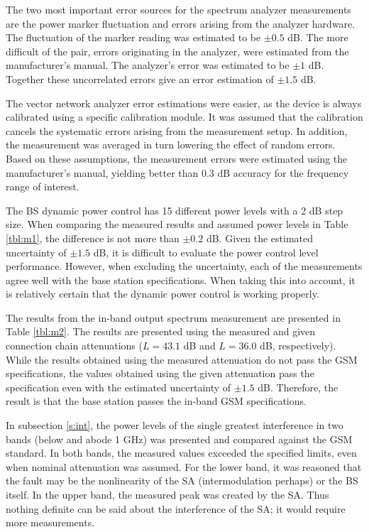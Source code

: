 \documentclass[a4paper, 12pt]{article}
\begin{document}
The two most important error sources for the spectrum analyzer measurements are 
the power marker fluctuation and errors arising from the analyzer hardware. 
The fluctuation of the marker reading was estimated to be $\pm 0.5$ dB. The more 
difficult of the pair, errors originating in the analyzer, were estimated from 
the manufacturer's manual. The analyzer’s error was estimated to be $\pm 1$ dB. 
Together these uncorrelated errors give an error estimation of $\pm 1.5$ dB.

The vector network analyzer error estimations were easier, as the device is 
always calibrated using a specific calibration module. It was assumed that the 
calibration cancels the systematic errors arising from the measurement setup. In 
addition, the measurement was averaged in turn lowering the effect of random errors. 
Based on these assumptions, the measurement errors were estimated using the 
manufacturer’s manual, yielding better than 0.3 dB accuracy for the frequency 
range of interest.

The BS dynamic power control has 15 different power levels with a 2 dB step size. 
When comparing the measured results and assumed power levels in Table \ref{tbl:m1}, 
the difference is not more than $\pm 0.2$ dB. Given the estimated uncertainty of 
$\pm 1.5$ dB, it is difficult to evaluate the power control level performance. 
However, when excluding the uncertainty, each of the measurements agree well with 
the base station specifications. When taking this into account, it is relatively 
certain that the dynamic power control is working properly.

The results from the in-band output spectrum measurement are presented in Table 
\ref{tbl:m2}. The results are presented using the measured and given connection 
chain attenuations ($L = 43.1$ dB and $L = 36.0$ dB, respectively). While the 
results obtained using the measured attenuation do not pass the GSM specifications, 
the values obtained using the given attenuation pass the specification even with 
the estimated uncertainty of $\pm 1.5$ dB. Therefore, the result is that the 
base station passes the in-band GSM specifications. 

In subsection \ref{s:int}, the power levels of the single greatest interference in 
two bands (below and abode 1 GHz) was presented and compared against the GSM standard. 
In both bands, the measured values exceeded the specified limits, even when nominal 
attenuation was assumed. For the lower band, it was reasoned that the fault may be the 
nonlinearity of the SA (intermodulation perhaps) or the BS itself. In the upper band, 
the measured peak was created by the SA. Thus nothing definite can be said about the 
interference of the SA; it would require more measurements.
\end{document}
